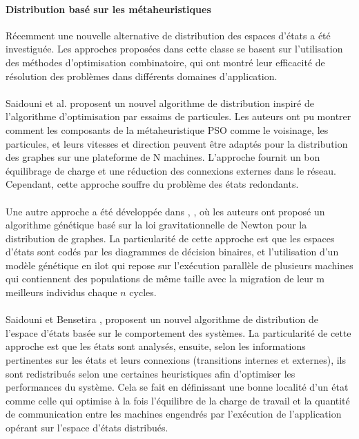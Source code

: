  \paragraph{Distribution basé sur les métaheuristiques}
Récemment une nouvelle alternative de distribution des espaces d'états a été investiguée. Les approches proposées dans cette classe se basent sur l'utilisation des méthodes d'optimisation combinatoire, qui ont montré leur efficacité de résolution des problèmes dans différents domaines d'application.
 \\\\ 
Saidouni et al. \citep{Saidouni2012} proposent un nouvel algorithme de distribution inspiré de l'algorithme d'optimisation par essaims de particules. Les auteurs ont pu montrer comment les composants de la métaheuristique PSO comme le voisinage, les particules, et leurs vitesses et direction peuvent être adaptés pour la distribution des graphes sur une plateforme de N machines. L'approche fournit un bon équilibrage de charge et une réduction des connexions externes dans le réseau. Cependant, cette approche souffre du problème des états redondants.
\\\\
Une autre approche a été développée dans  \citep{TabibSaidouni2016},  \citep{Tabib2017}, où les auteurs ont proposé un algorithme génétique basé sur la loi gravitationnelle de Newton pour la distribution de graphes. La particularité de cette approche est que les espaces d'états sont codés par les diagrammes de décision binaires, et l'utilisation d'un modèle génétique en ilot qui repose sur l'exécution parallèle de plusieurs machines qui contiennent des populations de même taille avec la migration de leur m meilleurs individus chaque $n$ cycles.
\\\\
Saidouni et Bensetira \citep{BENSETIRA2017}, proposent un nouvel algorithme de distribution de l'espace d'états basée sur le comportement des systèmes. La particularité de cette approche est que les états sont analysés, ensuite, selon les informations pertinentes sur les états et leurs connexions (transitions internes et externes), ils sont redistribués selon une certaines heuristiques afin d'optimiser les performances du système. Cela se fait en définissant une bonne localité d'un état comme celle qui optimise à la fois l'équilibre de la charge de travail et la quantité de communication entre les machines engendrés par l'exécution de l'application opérant sur l'espace d'états distribués.
